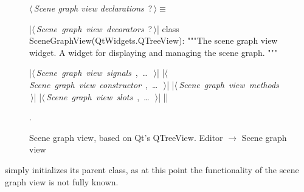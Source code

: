 \documentclass[%
    a4paper,    %
    justified,  %
    nobib,      %
    openany     %
]{tufte-book}
\makeatletter
\renewcommand{\label}[1]{\@tufte@label{##1}}%
\makeatother
\begin{document}
\begin{figure}
\begin{flushleft} \small
\begin{minipage}{\linewidth}\label{scrap40}\raggedright\small
{} $\langle\,${\itshape Scene graph view declarations}\nobreak\ {\footnotesize {?}}$\,\rangle\equiv$
\vspace{-1ex}
\begin{pythoncode}
|\hbox{$\langle\,${\itshape Scene graph view decorators}\nobreak\ {\footnotesize ?}$\,\rangle$}|
class SceneGraphView(QtWidgets.QTreeView):
    """The scene graph view widget.
    A widget for displaying and managing the scene graph.
    """

    |\hbox{$\langle\,${\itshape Scene graph view signals}\nobreak\ {\footnotesize {}, \ldots\ }$\,\rangle$}|
    |\hbox{$\langle\,${\itshape Scene graph view constructor}\nobreak\ {\footnotesize {}, \ldots\ }$\,\rangle$}|
    |\hbox{$\langle\,${\itshape Scene graph view methods}\nobreak\ {\footnotesize {}}$\,\rangle$}|
    |\hbox{$\langle\,${\itshape Scene graph view slots}\nobreak\ {\footnotesize {}, \ldots\ }$\,\rangle$}|
|\NWsep|
\end{pythoncode}
\vspace{1.5ex}
\footnotesize
\begin{list}{}{\setlength{\itemsep}{-\parsep}\setlength{\itemindent}{-\leftmargin}}
\item {\NWtxtMacroNoRef}.

\item{}
\end{list}
\end{minipage}\vspace{4ex}
\end{flushleft}
\caption{Scene graph view, based on Qt's QTreeView.
  \newline{}\newline{}Editor $\rightarrow$ Scene graph view}
\label{editor:lst:scene-graph-view}
\end{figure}

 simply initializes its parent class, as at this
point the functionality of the scene graph view is not fully known.
\end{document}
